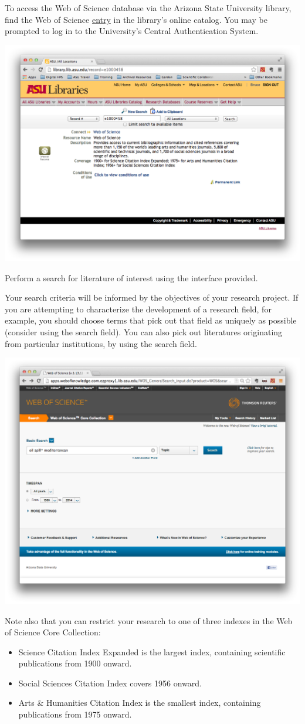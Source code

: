 \documentclass[letterpaper,10pt,english]{sphinxmanual}
\begin{document}
To access the Web of Science database via the Arizona State University library,
find the Web of Science \href{http://library.lib.asu.edu/record=e1000458}{entry} in the library's online catalog. You may be prompted
to log in to the University's Central Authentication System.

\includegraphics[width=0.600\linewidth]{getting.0.png}

Perform a search for literature of interest using the interface provided.

Your search criteria will be informed by the objectives of your research project. If you
are attempting to characterize the development of a research field, for example, you
should choose terms that pick out that field as uniquely as possible (consider using the
 search field). You can also pick out literatures originating from
particular institutions, by using the  search field.

\includegraphics[width=0.600\linewidth]{getting.1.png}

Note also that you can restrict your research to one of three indexes in the Web of Science Core Collection:
\begin{itemize}
\item {} 
Science Citation Index Expanded is the largest index, containing scientific
publications from 1900 onward.

\item {} 
Social Sciences Citation Index covers 1956 onward.

\item {} 
Arts \& Humanities Citation Index is the smallest index, containing publications from
1975 onward.

\end{itemize}
\end{document}
